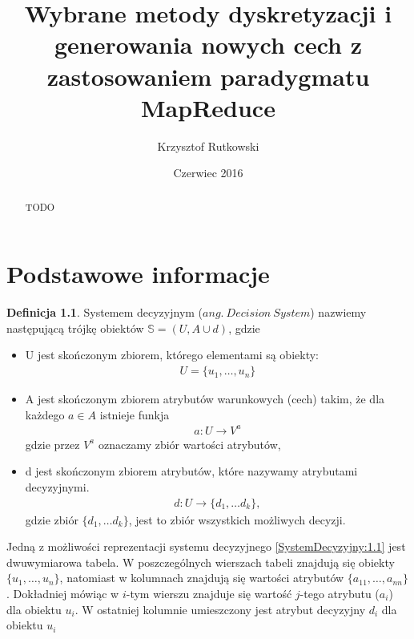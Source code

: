 \documentclass[magisterska]{pracamgr}
\author{Krzysztof Rutkowski}
\title{Wybrane metody dyskretyzacji i generowania nowych cech z zastosowaniem paradygmatu MapReduce}
\date{Czerwiec 2016}
\theoremstyle{plain}
\theoremstyle{definition}
\newtheorem{definicja}[thm]{Definicja}
\theoremstyle{remark}
\begin{document}
\begin{abstract}
TODO
\end{abstract}

\tableofcontents


\chapter{Podstawowe informacje}\label{r:pojecia}

\begin{definicja}
Systemem decyzyjnym ($ang. \ Decision \ System$) nazwiemy następującą
trójkę obiektów $\mathbb{S} = (U, A \cup d)$, gdzie
\begin{itemize}
 \item U jest skończonym zbiorem, którego elementami są obiekty:
    \begin{align*}
	    U = \{u_1, \ldots, u_n \}  
    \end{align*}

 \item A jest skończonym zbiorem atrybutów warunkowych (cech) takim, że dla każdego $ a \in A$ istnieje funkja
    \begin{align*}
	  a:U \rightarrow V^{a}
    \end{align*}
    gdzie przez $V^{a}$ oznaczamy zbiór wartości atrybutów,
    
 \item d jest skończonym zbiorem atrybutów, które nazywamy atrybutami decyzyjnymi.
    \begin{align*}
     d: U \rightarrow \{d_1, \ldots d_k\},
    \end{align*}
  gdzie zbiór $\{d_1, \ldots d_k\}$, jest to zbiór wszystkich możliwych decyzji.
\end{itemize}

\end{definicja}

Jedną z możliwości reprezentacji systemu decyzyjnego  \ref{SystemDecyzyjny:1.1} jest dwuwymiarowa tabela.
W poszczególnych wierszach tabeli znajdują się obiekty $\{u_1, \ldots, u_n \}$,
natomiast w kolumnach znajdują się wartości atrybutów $\{a_{11}, \ldots, a_{nn} \}$.
Dokładniej mówiąc w $i$-tym wierszu znajduje się wartość  $j$-tego atrybutu ($a_{i}$) dla obiektu $u_{i}$.
W ostatniej kolumnie umieszczony jest atrybut decyzyjny $d_{i}$ dla obiektu $u_i$
\end{document}
